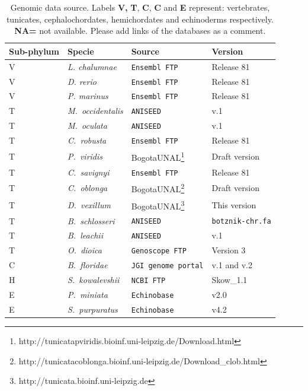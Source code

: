 \documentclass[11pt]{article}
\newcommand{\TODO}[1]{\begingroup\color{red}#1\endgroup}
\begin{document}
\begin{table}[ht!]
\centering
\begin{tabular}{p{2cm}lp{7.3cm}p{2.5cm}}
\toprule
\textbf{Sub-phylum} & \textbf{Specie} & \textbf{Source} & \textbf{Version} \\ 
\midrule
V & \textit{L. chalumnae} & \texttt{Ensembl FTP} & Release 81 \\
V & \textit{D. rerio} & \texttt{Ensembl FTP} & Release 81 \\
V & \textit{P. marinus} & \texttt{Ensembl FTP} & Release 81 \\
\midrule
T &\textsl{M.\ occidentalis} & \texttt{ANISEED} & v.1 \\
T &\textsl{M.\ oculata} & \texttt{ANISEED} & v.1 \\
T & \textit{C.\ robusta} & \texttt{Ensembl FTP} & Release 81 \\
T &\textsl{P.\ viridis} &
BogotaUNAL\footnote{http://tunicatapviridis.bioinf.uni-leipzig.de/Download.html}
 & Draft version \\ 
T & \textit{C.\ savignyi} & \texttt{Ensembl FTP} & Release 81 \\
T &\textsl{C.\ oblonga} & 
BogotaUNAL\footnote{
http://tunicatacoblonga.bioinf.uni-leipzig.de/Download\_clob.html } & Draft 
version \\
T & \textit{D.\ vexillum} 
& BogotaUNAL\footnote{http://tunicata.bioinf.uni-leipzig.de} & 
This version \\
T & \textit{B.\ schlosseri} & \texttt{ANISEED} & 
\texttt{botznik-chr.fa} \\
T & \textit{B.\ leachii} & \texttt{ANISEED} & v.1 \\
T & \textit{O.\ dioica} & \texttt{Genoscope FTP} & Version 3 \\
\midrule
C & \textit{B.\ floridae} & \texttt{JGI genome portal} & v.1 and v.2 \\
\midrule
H & \textit{S.\ kowalevshii} & \texttt{NCBI FTP} & Skow\_1.1 \\
E & \textit{P.\ miniata} & \texttt{Echinobase} & v2.0 \\
E & \textit{S.\ purpuratus} & \texttt{Echinobase} & v4.2 \\
\bottomrule
\end{tabular}
\caption{Genomic data source. Labels \textbf{V,} \textbf{T}, \textbf{C}, 
\textbf{C} and \textbf{E} represent: vertebrates, tunicates, cephalochordates, 
hemichordates and echinoderms respectively. \textbf{NA=} not available. 
\TODO{Please add links of the databases as a comment}.}
\label{table:source}
\end{table}
\end{document}
